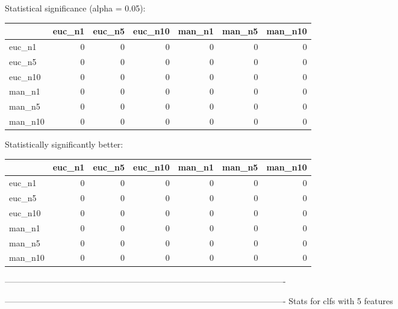 Statistical significance (alpha = 0.05):
 \begin{tabular}{lrrrrrr}
\hline
         &   euc\_n1 &   euc\_n5 &   euc\_n10 &   man\_n1 &   man\_n5 &   man\_n10 \\
\hline
 euc\_n1  &        0 &        0 &         0 &        0 &        0 &         0 \\
 euc\_n5  &        0 &        0 &         0 &        0 &        0 &         0 \\
 euc\_n10 &        0 &        0 &         0 &        0 &        0 &         0 \\
 man\_n1  &        0 &        0 &         0 &        0 &        0 &         0 \\
 man\_n5  &        0 &        0 &         0 &        0 &        0 &         0 \\
 man\_n10 &        0 &        0 &         0 &        0 &        0 &         0 \\
\hline
\end{tabular} 

Statistically significantly better:
 \begin{tabular}{lrrrrrr}
\hline
         &   euc\_n1 &   euc\_n5 &   euc\_n10 &   man\_n1 &   man\_n5 &   man\_n10 \\
\hline
 euc\_n1  &        0 &        0 &         0 &        0 &        0 &         0 \\
 euc\_n5  &        0 &        0 &         0 &        0 &        0 &         0 \\
 euc\_n10 &        0 &        0 &         0 &        0 &        0 &         0 \\
 man\_n1  &        0 &        0 &         0 &        0 &        0 &         0 \\
 man\_n5  &        0 &        0 &         0 &        0 &        0 &         0 \\
 man\_n10 &        0 &        0 &         0 &        0 &        0 &         0 \\
\hline
\end{tabular} 

----------------------------------------------------------------------------------------------------



----------------------------------------------------------------------------------------------------
Stats for clfs with 5 features


